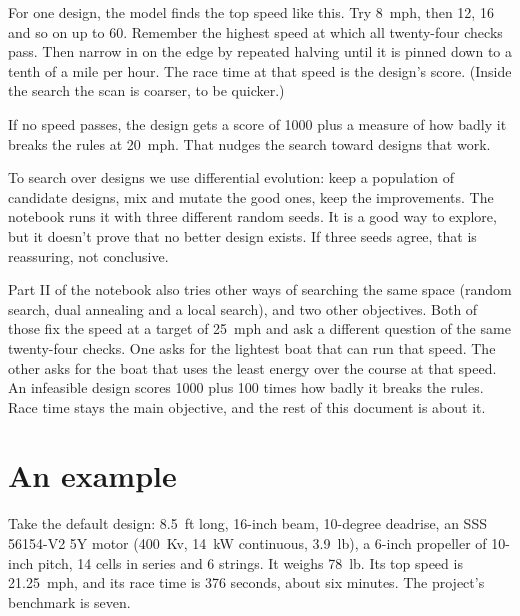 \documentclass[11pt,a4paper]{article}
\renewcommand{\_}{\textunderscore\allowbreak}
\begin{document}
For one design, the model finds the top speed like this. Try 8~mph, then 12, 16 and so on up to 60. Remember the highest speed at which all twenty-four checks pass. Then narrow in on the edge by repeated halving
until it is pinned down to a tenth of a mile per hour. The race time at that speed is the design's score. (Inside the search the scan is coarser, to be quicker.)

If no speed passes, the design gets a score of 1000 plus a measure of how badly it breaks the rules at 20~mph. That nudges the search toward designs that work.

To search over designs we use differential evolution: keep a population of candidate designs, mix and mutate the good ones, keep the improvements. The notebook runs it with three different random seeds.
It is a good way to explore, but it doesn't prove that no better design exists. If three seeds agree, that is reassuring, not conclusive.

Part II of the notebook also tries other ways of searching the same space (random search, dual annealing and a local search), and two other objectives.
Both of those fix the speed at a target of 25~mph and ask a different question of the same twenty-four checks. One asks for the lightest boat that can run that speed. The other asks for the boat
that uses the least energy over the course at that speed. An infeasible design scores 1000 plus 100 times how badly it breaks the rules. Race time stays the main objective, and the rest of this document is about it.

\section*{An example}

Take the default design: 8.5~ft long, 16-inch beam, 10-degree deadrise, an SSS 56154-V2 5Y motor (400~Kv, 14~kW continuous, 3.9~lb), a 6-inch propeller of 10-inch pitch, 14 cells in series and 6 strings. It weighs 78~lb. Its top speed is 21.25~mph, and its race time is 376 seconds,
about six minutes. The project's benchmark is seven.
\end{document}
